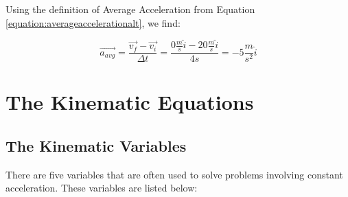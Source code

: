 \begin{mdframed}[backgroundcolor=blue!10!white]
\begin{center}
	\end{center}	
	
	
	 Using the definition of Average Acceleration from Equation \ref{equation:averageaccelerationalt}, we find:
	
	\begin{equation*}
			\overrightarrow{a_{avg}} = \frac{\overrightarrow{v_f} - \overrightarrow {v_i}}{\Delta t} = \frac{0 \frac{m}{s} \hat{i} - 20 \frac{m}{s} \hat{i}}{4 s}   = -5 \frac{m}{s^2} \hat{i}
	\end{equation*}
\end{mdframed}

\section{The Kinematic Equations} 
\subsection{The Kinematic Variables} 
There are five variables that are often used to solve problems involving constant acceleration.  These variables are listed below:

